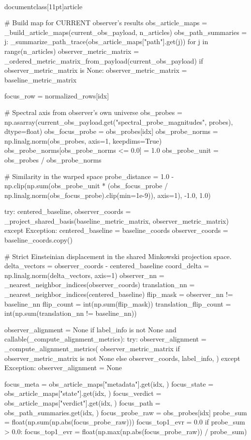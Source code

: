 \\documentclass[11pt]{article}
\begin{document}
\begin{CodeBlock}
        # Build map for CURRENT observer's results
        obs_article_maps = _build_article_maps(current_obs_payload, n_articles)
        obs_path_summaries = {
            j: _summarize_path_trace(obs_article_maps["path"].get(j))
            for j in range(n_articles)
        }
        observer_metric_matrix = _ordered_metric_matrix_from_payload(current_obs_payload)
        if observer_metric_matrix is None:
            observer_metric_matrix = baseline_metric_matrix

        focus_row = normalized_rows[idx]
        
        # Spectral axis from observer's own universe
        obs_probes = np.asarray(current_obs_payload.get("spectral_probe_magnitudes", probes), dtype=float)
        obs_focus_probe = obs_probes[idx]
        obs_probe_norms = np.linalg.norm(obs_probes, axis=1, keepdims=True)
        obs_probe_norms[obs_probe_norms <= 0.0] = 1.0
        obs_probe_unit = obs_probes / obs_probe_norms
        
        # Similarity in the warped space
        probe_distance = 1.0 - np.clip(np.sum(obs_probe_unit * (obs_focus_probe / np.linalg.norm(obs_focus_probe).clip(min=1e-9)), axis=1), -1.0, 1.0)

        try:
            centered_baseline, observer_coords = _project_shared_basis(baseline_metric_matrix, observer_metric_matrix)
        except Exception:
            centered_baseline = baseline_coords
            observer_coords = baseline_coords.copy()

        # Strict Einsteinian displacement in the shared Minkowski projection space.
        delta_vectors = observer_coords - centered_baseline
        coord_delta = np.linalg.norm(delta_vectors, axis=1)
        observer_nn = _nearest_neighbor_indices(observer_coords)
        translation_nn = _nearest_neighbor_indices(centered_baseline)
        flip_mask = observer_nn != baseline_nn
        flip_count = int(np.sum(flip_mask))
        translation_flip_count = int(np.sum(translation_nn != baseline_nn))
        
        observer_alignment = None
        if label_info is not None and callable(_compute_alignment_metrics):
            try:
                observer_alignment = _compute_alignment_metrics(
                    observer_metric_matrix if observer_metric_matrix is not None else observer_coords,
                    label_info,
                )
            except Exception:
                observer_alignment = None

        focus_meta = obs_article_maps["metadata"].get(idx, {})
        focus_state = obs_article_maps["state"].get(idx, {})
        focus_verdict = obs_article_maps["verdict"].get(idx, {})
        focus_path = obs_path_summaries.get(idx, {})
        focus_probe_raw = obs_probes[idx]
        probe_sum = float(np.sum(np.abs(focus_probe_raw)))
        focus_top1_evr = 0.0
        if probe_sum > 0.0:
            focus_top1_evr = float(np.max(np.abs(focus_probe_raw)) / probe_sum)


\end{CodeBlock}
\end{document}
